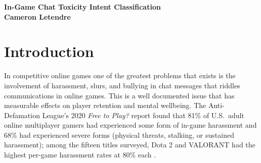 \documentclass[a4paper,10.5pt,twoside]{article}
\begin{document}
\fancyhead[LE]{\thepage\ \ \ \   }
\begin{center}
\LARGE
\textbf{ In-Game Chat Toxicity Intent Classification} \\[12pt]
\normalsize
\textbf {Cameron Letendre}\\[4pt]
\end{center}

\begin{abstract}
\normalsize
Inside this paper we explore the possibility of creating a more accurate prediction of toxicity in gaming messages, while trying to preserve speed for a real-time overlay. Modern gaming is known to be very structurally different from common language, but more than that because of the heavy involvement of slang, acronyms, and in-game vocabulary along with an average of 4 characters per message this creates a challenge for machine learning to predict the meaning of utterances. In this paper we attempt to do intent classification for predicting them into one of four groups: (E) Explicit Toxicity, (I) Implicit Toxicity, (A) Action, and (O) Other. This classification task for this assignment is done by a DistilBERT model that is fine-tuned on a labeled dataset known as CONDA. We additionally test whether normalised game-time context, prepended to each message as [TIME=x.xx], can help for the loss of conversational context that occurs when classifying messages one at a time, and report a small but consistent negative result.
\vspace{1em}
\end{abstract}

\section*{Introduction}

In competitive online games one of the greatest problems that exists is the involvement of harassment, slurs, and bullying in chat messages that riddles communications in online games. This is a well documented issue that has measurable effects on player retention and mental wellbeing. The Anti-Defamation League's 2020 \emph{Free to Play?} report found that 81\% of U.S.\ adult online multiplayer gamers had experienced some form of in-game harassment and 68\% had experienced severe forms (physical threats, stalking, or sustained harassment); among the fifteen titles surveyed, Dota 2 and VALORANT had the highest per-game harassment rates at 80\% each \autocite{adl2020freetoplay}.
\vspace{1em}
\end{document}
